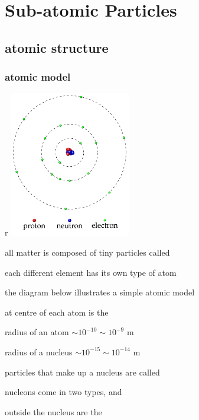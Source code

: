 \chapter{Sub-atomic Particles}

\section{atomic structure}

\subsection{atomic model}\label{ch:atomic-model}

\begin{marginfigure}{r}
	\vspace*{5pt}
	\centering
	\includegraphics[height=180pt]{atomic-model.pdf}
	\vspace*{-20pt}
\end{marginfigure}

all matter is composed of tiny particles called 

each different element has its own type of atom

the diagram below illustrates a simple atomic model


\cmt at centre of each atom is the 

\cmt radius of an atom $\sim 10^{-10} \sim 10^{-9} \text{ m}$

radius of a nucleus $\sim 10^{-15} \sim 10^{-14} \text{ m}$

\cmt particles that make up a nucleus are called 

nucleons come in two types,  and 

\cmt outside the nucleus are the 

